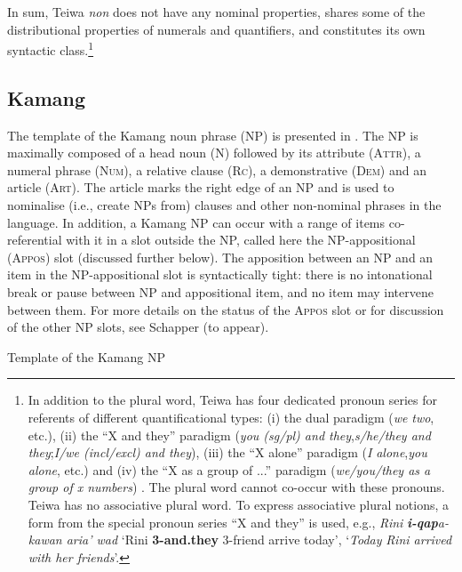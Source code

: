 In sum, Teiwa \textit{non} does not have any nominal properties, shares some of the distributional properties of numerals and quantifiers, and constitutes its own syntactic class.\footnote{In addition to the plural word, Teiwa has four dedicated pronoun series for referents of different quantificational types: (i) the dual paradigm (\textit{we} \textit{two}, etc.), (ii) the ``X and they'' paradigm (\textit{you (sg/pl) and they},\textit{s/he/they and they};\textit{I/we (incl/excl) and they}), (iii) the ``X alone'' paradigm (\textit{I} \textit{alone},\textit{you} \textit{alone}, etc.) and (iv) the ``X as a group of ...'' paradigm (\textit{we/you/they as a group of x numbers}) \citep[82-85]{Klamer2010grammar}. The plural word cannot co-occur with these pronouns. Teiwa has no associative plural word. To express associative plural notions, a form from the special pronoun series ``X and they'' is used, e.g., \textit{Rini } \textbf{\textit{i-qap}}\textit{a-kawan aria' wad } `Rini \textbf{3-and.they} 3-friend
arrive today',  `\textit{Today} \textit{Rini arrived with her friends}'.}

\subsection{Kamang} %
\label{sec:9:3.3}
The template of the Kamang noun phrase (NP) is presented in . The NP is maximally composed of a head noun (\textsc{N}) followed by its attribute (\textsc{Attr),} a numeral phrase \textsc{(Num)}, a relative clause (\textsc{Rc}), a demonstrative \textsc{(Dem)} and an article \textsc{(Art)}. The article marks the right edge of an NP and is used to nominalise (i.e., create NPs from) clauses and other non-nominal phrases in the language. In addition, a Kamang NP can occur with a range of items co-referential with it in a slot outside the NP, called here the NP-appositional (\textsc{Appos)} slot (discussed further below). The apposition between an NP and an item in the NP-appositional slot is syntactically tight: there is no intonational break or pause between NP and appositional item, and no item may intervene between them. For more details on the status of the \textsc{Appos} slot or for discussion of the other NP slots, see Schapper (to appear).

\ea%
\label{ex:9:31}
\upshape
Template of the Kamang NP  

